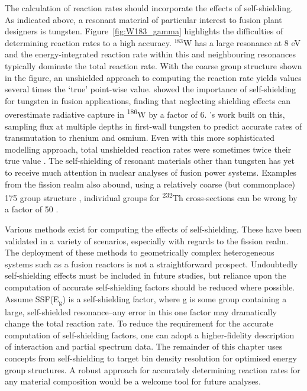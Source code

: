 The calculation of reaction rates should incorporate the effects of self-shielding. As indicated above, a resonant material of particular interest to fusion plant designers is tungsten. Figure~\ref{fig:W183_gamma} highlights the difficulties of determining reaction rates to a high accuracy. $^{183}$W has a large resonance at 8 eV and the energy-integrated reaction rate within this and neighbouring resonances typically dominate the total reaction rate. With the coarse group structure shown in the figure, an unshielded approach to computing the reaction rate yields values several times the `true' point-wise value. \citeauthor{Pampin2005} showed the importance of self-shielding for tungsten in fusion applications, finding that neglecting shielding effects can overestimate radiative capture in \textsuperscript{186}W by a factor of 6. \citeauthor{Gilbert2016}'s work built on this, sampling flux at multiple depths in first-wall tungsten to predict accurate rates of transmutation to rhenium and osmium. Even with this more sophisticated modelling approach, total unshielded reaction rates were sometimes twice their true value \cite{Gilbert2016}. The self-shielding of resonant materials other than tungsten has yet to receive much attention in nuclear analyses of fusion power systems. Examples from the fission realm also abound, using a relatively coarse (but commonplace) 175 group structure \cite{Plechaty1978}, individual groups for \textsuperscript{232}Th cross-sections can be wrong by a factor of 50 \cite{Cacuci2010}. 

Various methods exist for computing the effects of self-shielding. These have been validated in a variety of scenarios, especially with regards to the fission realm. The deployment of these methods to geometrically complex heterogeneous systems such as a fusion reactors is not a straightforward prospect. Undoubtedly self-shielding effects must be included in future studies, but reliance upon the computation of accurate self-shielding factors should be reduced where possible. Assume SSF(E\textsubscript{g}) is a self-shielding factor, where g is some group containing a large, self-shielded resonance--any error in this one factor may dramatically change the total reaction rate. To reduce the requirement for the accurate computation of self-shielding factors, one can adopt a higher-fidelity description of interaction and partial spectrum data. The remainder of this chapter uses concepts from self-shielding to target bin density resolution for optimised energy group structures. A robust approach for accurately determining reaction rates for any material composition would be a welcome tool for future analyses. 

